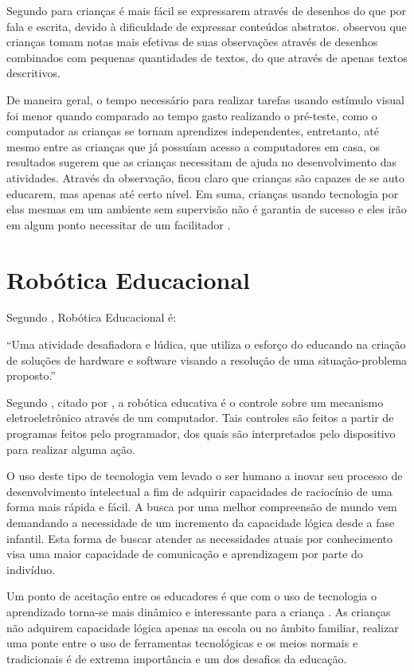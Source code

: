 Segundo  para crianças é mais fácil se expressarem através de desenhos do que por fala e escrita, devido à dificuldade
de expressar conteúdos abstratos.  observou que crianças tomam notas mais efetivas de suas observações através de
desenhos combinados com pequenas quantidades de textos, do que através de apenas textos descritivos.

De maneira geral, o tempo necessário para realizar tarefas usando estímulo visual foi menor quando comparado ao tempo gasto
realizando o pré-teste, como o computador as crianças se tornam aprendizes independentes, entretanto, até mesmo entre as crianças
que já possuíam acesso a computadores em casa, os resultados sugerem que as crianças necessitam de ajuda no desenvolvimento das
atividades. Através da observação, ficou claro que crianças são capazes de se auto educarem, mas apenas até certo nível. Em suma,
crianças usando tecnologia por elas mesmas em um ambiente sem supervisão não é garantia de sucesso e eles irão em algum ponto
necessitar de um facilitador \cite{husnoo:2013}.

\section{Robótica Educacional}

Segundo , Robótica Educacional é:

“Uma atividade desafiadora e lúdica, que utiliza o esforço do educando na criação de soluções de hardware e software visando a
resolução de uma situação-problema proposto.”

Segundo , citado por , a robótica educativa é o controle sobre um mecanismo
eletroeletrônico através de um computador. Tais controles são feitos a partir de programas feitos pelo programador, dos quais
são interpretados pelo dispositivo para realizar alguma ação.

O uso deste tipo de tecnologia vem levado o ser humano a inovar seu processo de desenvolvimento intelectual a fim de adquirir
capacidades de raciocínio de uma forma mais rápida e fácil. A busca por uma melhor compreensão de mundo vem demandando a necessidade
de um incremento da capacidade lógica desde a fase infantil. Esta forma de buscar atender as necessidades atuais por conhecimento
visa uma maior capacidade de comunicação e aprendizagem por parte do indivíduo.

Um ponto de aceitação entre os educadores é que com o uso de tecnologia o aprendizado torna-se mais dinâmico e interessante para
a criança \cite{zilli:2004}. As crianças não adquirem capacidade lógica apenas na escola ou no âmbito familiar, realizar uma ponte
entre o uso de ferramentas tecnológicas e os meios normais e tradicionais é de extrema importância e um dos desafios da educação.

